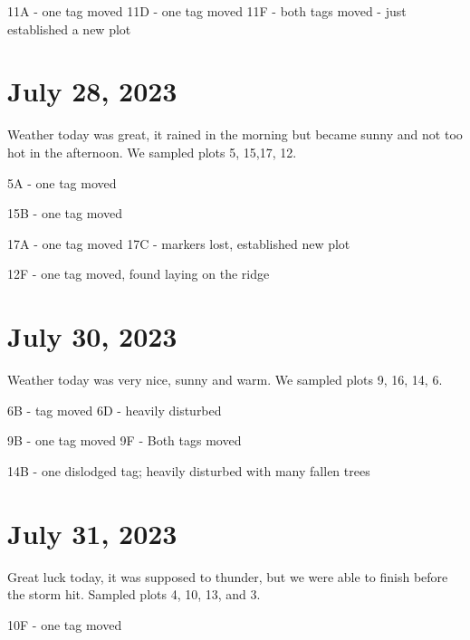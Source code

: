 \documentclass{article}\usepackage[]{graphicx}\usepackage[]{color}
\begin{document}
11A - one tag moved
11D - one tag moved
11F - both tags moved - just established a new plot

\section{July 28, 2023}
Weather today was great, it rained in the morning but became sunny and not too hot in the afternoon. We sampled plots 5, 15,17, 12.

5A - one tag moved

15B - one tag moved

17A - one tag moved
17C - markers lost, established new plot

12F - one tag moved, found laying on the ridge

\section{July 30, 2023}
Weather today was very nice, sunny and warm. We sampled plots 9, 16, 14,  6.

6B - tag moved
6D - heavily disturbed

9B - one tag moved
9F - Both tags moved

14B - one dislodged tag; heavily disturbed with many fallen trees

\section{July 31, 2023}
Great luck today, it was supposed to thunder, but we were able to finish before the storm hit. Sampled plots 4, 10, 13, and 3.

10F - one tag moved
\end{document}
